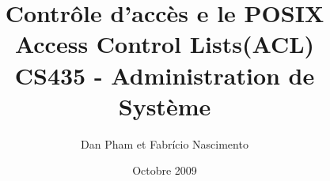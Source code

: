 \usepackage[francais]{babel}
\usepackage[utf8]{inputenc}

\usepackage{graphicx} 

\usepackage{algorithmic}
\usepackage{algorithm}


\title{\textbf{Contrôle d'accès e le POSIX Access Control Lists(ACL)} \\ CS435 - Administration de Système }
\author{Dan Pham et Fabrício Nascimento}
\date{Octobre 2009}



\maketitle
\newpage








